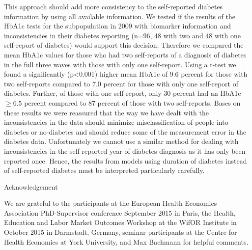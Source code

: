 \documentclass[12pt,english,british]{article}
\begin{document}
\begin{appendix}
This approach should add more consistency to the self-reported diabetes
information by using all available information. We tested if the results
of the \ac{HbA1c} tests for the subpopulation in 2009 with biomarker
information and inconsistencies in their diabetes reporting (n=96,
48 with two and 48 with one self-report of diabetes) would support
this decision. Therefore we compared the mean \ac{HbA1c} values for those
who had two self-reports of a diagnosis of diabetes in the full three
waves with those with only one self-report. Using a t-test we found
a significantly (p<0.001) higher mean \ac{HbA1c} of 9.6 percent
for those with two self-reports compared to 7.0 percent for those
with only one self-report of diabetes. Further, of those with one
self-report, only 30 percent had an \ac{HbA1c}$\geq6.5$ percent
compared to 87 percent of those with two self-reports. Bases on these results we were reassured that the way we have dealt with the inconsistencies in the data should
minimize misclassification of people into diabetes or no-diabetes
and should reduce some of the measurement error in the diabetes data. Unfortunately we cannot use a similar method for dealing with inconsistencies
in the self-reported year of diabetes diagnosis as it has only been reported once. Hence, the results from models using
duration of diabetes instead of self-reported diabetes must be interpreted
particularly carefully.

\end{appendix}

Acknowledgement

We are grateful to the participants at the European Health Economics Association PhD-Supervisor conference September 2015 in Paris, the Health, Education and Labor Market Outcomes Workshop at the WifOR Institute in October 2015 in Darmstadt, Germany, seminar participants at the Centre for Health Economics at York University, and Max Bachmann for helpful comments.

\noindent  

%


\end{document}
